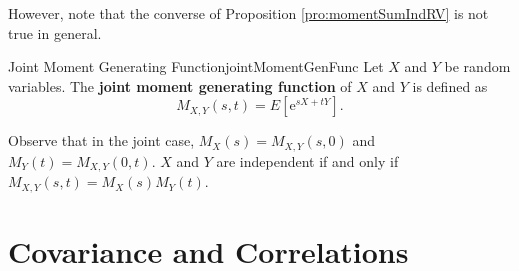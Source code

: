 \documentclass[math]{amznotes}
\theoremstyle{remark}
\newcommand{\e}{\mathrm{e}}
\begin{document}
However, note that the converse of Proposition \ref{pro:momentSumIndRV} is not true in general.
\begin{dfnbox}{Joint Moment Generating Function}{jointMomentGenFunc}
    Let $X$ and $Y$ be random variables. The {\color{red} \textbf{joint moment generating function}} of $X$ and $Y$ is defined as
    \begin{equation*}
        M_{X, Y}(s, t) = E\left[\e^{sX + tY}\right].
    \end{equation*}
\end{dfnbox}
Observe that in the joint case, $M_X(s) = M_{X, Y}(s, 0)$ and $M_Y(t) = M_{X, Y}(0, t)$. $X$ and $Y$ are independent if and only if $M_{X, Y}(s, t) = M_X(s)M_Y(t)$.
\section{Covariance and Correlations}
\end{document}
